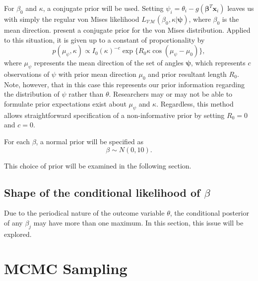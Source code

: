 \documentclass[12pt,a4paper]{article}
\begin{document}
For $\beta_0$ and $\kappa$, a conjugate prior will be used. Setting $\psi_i = \theta_i - g(\boldsymbol\beta^T \boldsymbol{x}_i)$ leaves us with simply the regular von Mises likelihood $L_{\mathcal{VM}}(\beta_0, \kappa \vert \boldsymbol\psi)$, where $\beta_0$ is the mean direction. \citet{guttorp1988finding} present a conjugate prior for the von Mises distribution. Applied to this situation, it is given up to a constant of proportionality by 
\begin{equation}
p(\mu_{\psi}, \kappa) \propto  I_0 (\kappa) ^{-c} \exp\{R_0 \kappa \cos (\mu_{\psi} - \mu_0)\},
\end{equation}
where $\mu_{\psi}$ represents the mean direction of the set of angles $\boldsymbol\psi$,  which represents $c$ observations of $\psi$ with prior mean direction $\mu_0$ and prior resultant length $R_0$. Note, however, that in this case this represents our prior information regarding the distribution of $\psi$ rather than $\theta$. Researchers may or may not be able to formulate prior expectations exist about $\mu_{\psi}$ and $\kappa$. Regardless, this method allows straightforward specification of a non-informative prior by setting $R_0 = 0$ and $c = 0$. 

For each $\beta$, a normal prior will be specified as 
\begin{equation}
\beta \sim N(0, 10).
\end{equation}

This choice of prior will be examined in the following section. 

\subsection{Shape of the conditional likelihood of $\beta$}

Due to the periodical nature of the outcome variable $\theta$, the conditional posterior of any $\beta_j$ may have more than one maximum. In this section, this issue will be explored. 




\section{MCMC Sampling}
\end{document}
